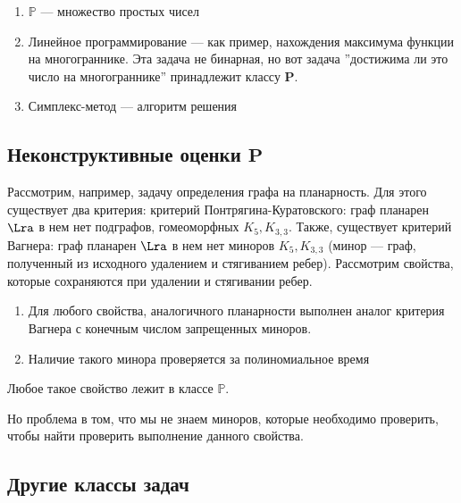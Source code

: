 \begin{example}
    \begin{enumerate}
        \item \(\mathbb{P}\) --- множество простых чисел
        \item Линейное программирование --- как пример, нахождения максимума функции на многограннике. Эта задача не бинарная, но вот задача ''достижима ли это число на многограннике'' принадлежит классу \(\mathbf{P}\).
        \item Симплекс-метод --- алгоритм решения 
    \end{enumerate}
\end{example}

\subsection{Неконструктивные оценки \(\mathbf{P}\)}
Рассмотрим, например, задачу определения графа на планарность. Для этого существует два критерия: критерий Понтрягина-Куратовского: граф планарен \(\Lra\) в нем нет подграфов, гомеоморфных \(K_5, K_{3,3}\). Также, существует критерий Вагнера: граф планарен \(\Lra\) в нем нет миноров \(K_5, K_{3,3}\) (минор --- граф, полученный из исходного удалением и стягиванием ребер). Рассмотрим свойства, которые сохраняются при удалении и стягивании ребер.

\begin{theorem}
    \begin{enumerate}
        \item Для любого свойства, аналогичного планарности выполнен аналог критерия Вагнера с конечным числом запрещенных миноров.
        \item Наличие такого минора проверяется за полиномиальное время
    \end{enumerate}
\end{theorem}

\begin{corollary}
    Любое такое свойство лежит в классе \(\mathbb{P}\).
\end{corollary}

Но проблема в том, что мы не знаем миноров, которые необходимо проверить, чтобы найти проверить выполнение данного свойства.

\subsection{Другие классы задач}

